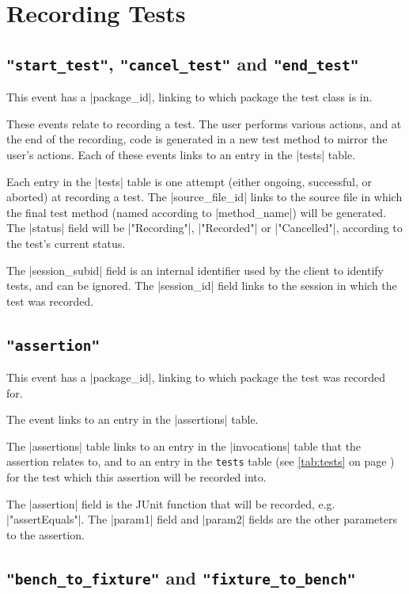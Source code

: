 \documentclass{report}
\newcommand{\myref}[1]{\autoref{#1} on page \pageref*{#1}}
\newcommand{\tabref}[1]{\lstinline|#1| table (see \myref{tab:#1})}
\begin{document}
\section{Recording Tests}

\subsection{\lstinline!"start_test"!, \lstinline!"cancel_test"! and \lstinline!"end_test"!}

This event has a |package_id|, linking to which package the test class
is in.

These events relate to recording a test.  The user performs various actions,
and at the end of the recording, code is generated in a new test method to
mirror the user's actions.  Each of these events links to an entry in the
|tests| table.


Each entry in the |tests| table is one attempt (either ongoing, successful, or
aborted) at recording a test.  The |source_file_id| links to the source file
in which the final test method (named according to |method_name|) will be
generated.  The |status| field will be |"Recording"|, |"Recorded"| or
|"Cancelled"|, according to the test's current status.

The |session_subid| field is an internal identifier used by the client to
identify tests, and can be ignored.  The |session_id| field links to the
session in which the test was recorded.

\subsection{\lstinline!"assertion"!}

This event has a |package_id|, linking to which package the test was
recorded for.

The event links to an entry in the |assertions| table.


The |assertions| table links to an entry in the |invocations| table that the assertion
relates to, and to an entry in the \tabref{tests} for the test which
this assertion will be recorded into.

The |assertion| field is the JUnit function that will be recorded,
e.g. |"assertEquals"|.  The |param1| field and |param2| fields are
the other parameters to the assertion.

\subsection{\lstinline!"bench_to_fixture"! and \lstinline!"fixture_to_bench"!}
\end{document}

